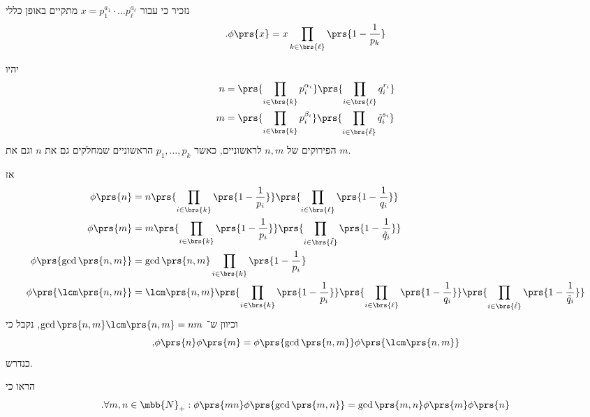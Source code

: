 \documentclass[a4paper,10pt,twoside,openany]{book}
\begin{document}
\begin{solution}
נזכיר כי עבור
$x = p_1^{a_1} \cdot \ldots p_{\ell}^{a_{\ell}}$
מתקיים באופן כללי
\[\text{.} \phi\prs{x} = x \prod_{k \in \brs{\ell}} \prs{1 - \frac{1}{p_k}}\]

יהיו
\begin{align*}
n &= \prs{\prod_{i \in \brs{k}} p_i^{\alpha_i}} \prs{\prod_{i \in \brs{\ell}} q_i^{r_i}} \\
m &= \prs{\prod_{i \in \brs{k}} p_i^{\beta_i}} \prs{\prod_{i \in \brs{\tilde{\ell}}} \tilde{q}_i^{s_i}}
\end{align*}
הפירוקים של
$n,m$
לראשוניים, כאשר
$p_1, \ldots, p_k$
הראשוניים שמחלקים גם את
$n$
וגם את
$m$.

אז
\begin{align*}
\phi\prs{n} &= n \prs{\prod_{i \in \brs{k}} \prs{1 - \frac{1}{p_i}}} \prs{\prod_{i \in \brs{\ell}} \prs{1 - \frac{1}{q_i}}}
\\
\phi\prs{m} &= m  \prs{\prod_{i \in \brs{k}} \prs{1 - \frac{1}{p_i}}} \prs{\prod_{i \in \brs{\tilde{\ell}}} \prs{1 - \frac{1}{\tilde{q}_i}}}
\\
\phi\prs{\gcd\prs{n,m}} &= \gcd\prs{n,m} \prod_{i \in \brs{k}} \prs{1 - \frac{1}{p_i}}
\\
\phi\prs{\lcm\prs{n,m}} &= \lcm\prs{n,m} \prs{\prod_{i \in \brs{k}} \prs{1 - \frac{1}{p_i}}} \prs{\prod_{i \in \brs{\ell}} \prs{1 - \frac{1}{q_i}}} \prs{\prod_{i \in \brs{\tilde{\ell}}} \prs{1 - \frac{1}{\tilde{q}_i}}}
\end{align*}
וכיוון ש־%
$\gcd\prs{n,m} \lcm\prs{n,m} = nm$,
נקבל כי
\[\text{,}\phi\prs{n} \phi\prs{m} = \phi\prs{\gcd\prs{n,m}} \phi\prs{\lcm\prs{n,m}}\]
כנדרש.
\end{solution}

\begin{exercisechap}
הראו כי
\[\text{.} \forall m,n \in \mbb{N}_+ : \phi\prs{mn} \phi\prs{\gcd\prs{m,n}} = \gcd\prs{m,n} \phi\prs{m} \phi\prs{n}\]
\end{exercisechap}
\end{document}
